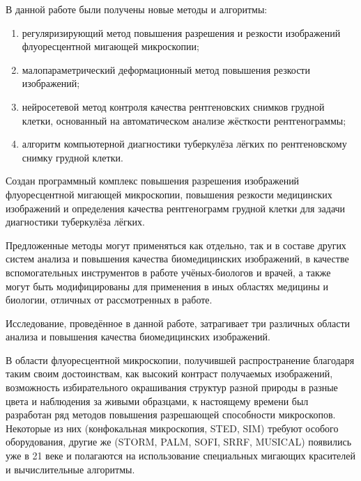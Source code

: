 В данной работе были получены новые методы и алгоритмы:
\begin{enumerate}[beginpenalty=10000]
	\item регуляризирующий метод повышения разрешения и резкости изображений флуоресцентной мигающей микроскопии;
	
	\item малопараметрический деформационный метод повышения резкости изображений;
	
	\item нейросетевой метод контроля качества рентгеновских снимков грудной клетки, основанный на автоматическом анализе жёсткости рентгенограммы;
	
	\item алгоритм компьютерной диагностики туберкулёза лёгких по рентгеновскому снимку грудной клетки.
\end{enumerate}


{\influence}

Создан программный комплекс повышения разрешения изображений флуоресцентной мигающей микроскопии, повышения резкости медицинских изображений и определения качества рентгенограмм грудной клетки для задачи диагностики туберкулёза лёгких.

Предложенные методы могут применяться как отдельно, так и в составе других систем анализа и повышения качества биомедицинских изображений, в качестве вспомогательных инструментов в работе учёных-биологов и врачей, а также могут быть модифицированы для применения в иных областях медицины и биологии, отличных от рассмотренных в работе.


{\progress}

Исследование, проведённое в данной работе, затрагивает три различных области анализа и повышения качества биомедицинских изображений.

В области флуоресцентной микроскопии, получившей распространение благодаря таким своим достоинствам, как высокий контраст получаемых изображений, возможность избирательного окрашивания структур разной природы в разные цвета и наблюдения за живыми образцами, к настоящему времени был разработан ряд методов повышения разрешающей способности микроскопов. Некоторые из них (конфокальная микроскопия, STED, SIM) требуют особого оборудования, другие же (STORM, PALM, SOFI, SRRF, MUSICAL) появились уже в 21 веке и полагаются на использование специальных мигающих красителей и вычислительные алгоритмы.

